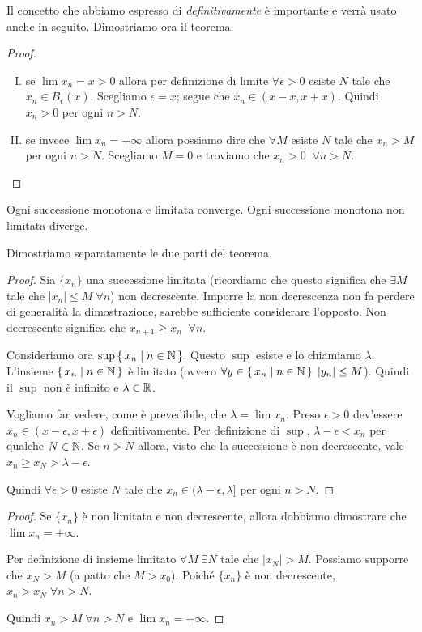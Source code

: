 Il concetto che abbiamo espresso di \emph{definitivamente} è importante e verrà usato anche in seguito. Dimostriamo ora il teorema.

\begin{proof} \hfill
\begin{enumerate}[I.]
\item se $\lim x_n = x > 0$ allora per definizione di limite $\forall \epsilon > 0$ esiste $N$ tale che $x_n \in B_{\epsilon}(x)$. Scegliamo $\epsilon = x$; segue che $x_n \in (x-x, x+x)$. Quindi $x_n > 0$ per ogni $n > N$.
\item se invece $\lim x_n = +\infty$ allora possiamo dire che $\forall M$ esiste $N$ tale che $x_n > M$ per ogni $n > N$. Scegliamo $M = 0$ e troviamo che $x_n > 0 \; \; \forall n > N$.
\end{enumerate}
\end{proof}

\begin{theorem}
Ogni successione monotona e limitata converge. Ogni successione monotona non limitata diverge. 
\end{theorem}

Dimostriamo separatamente le due parti del teorema.

\begin{proof}
Sia $\{x_n\}$ una successione limitata (ricordiamo che questo significa che $\exists M$ tale che $|x_n| \le M \; \forall n$) non decrescente. Imporre la non decrescenza non fa perdere di generalità la dimostrazione, sarebbe sufficiente considerare l'opposto. Non decrescente significa che $x_{n+1} \ge x_n \;\; \forall n$.

Consideriamo ora $\sup \set{x_n | n \in \mathbb N}$. Questo $\sup$ esiste e lo chiamiamo $\lambda$. L'insieme $\set{x_n | n \in \mathbb N}$ è limitato (ovvero $\forall y \in \set{x_n | n \in \mathbb N} \; |y_n| \le M$). Quindi il $\sup$ non è infinito e $\lambda \in \mathbb R$.

Vogliamo far vedere, come è prevedibile, che $\lambda = \lim x_n$. Preso $\epsilon > 0$ dev'essere $x_n \in (x-\epsilon, x+\epsilon)$ definitivamente. Per definizione di $\sup$, $\lambda - \epsilon < x_n$ per qualche $N \in \mathbb N$. Se $n > N$ allora, visto che la successione è non decrescente, vale $x_n \ge x_N > \lambda - \epsilon$.

Quindi $\forall \epsilon > 0$ esiste $N$ tale che $x_n \in (\lambda - \epsilon, \lambda]$ per ogni $n > N$.
\end{proof}

\begin{proof}
Se $\{x_n\}$ è non limitata e non decrescente, allora dobbiamo dimostrare che $\lim x_n = +\infty$.

Per definizione di insieme limitato $\forall M \; \exists N$ tale che $|x_N|>M$. Possiamo supporre che $x_N > M$ (a patto che $M > x_0$). Poiché $\{x_n\}$ è non decrescente, $x_n > x_N \; \forall n > N$.

Quindi $x_n > M \; \forall n > N$ e $\lim x_n = +\infty$.
\end{proof}

